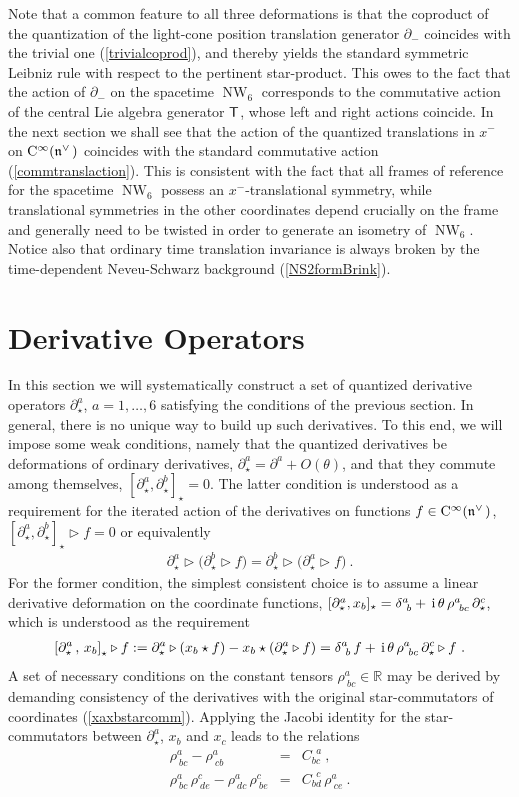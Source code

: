 \documentclass[11pt,a4paper]{article}
\DeclareMathOperator{\NW}{NW}
\newcommand{\1}{\mathbb{1}}
\def\ii{{\,{\rm i}\,}}
\def\CC{{\rm C}}
\def\T{{\sf T}}
\def\mfn{{\mathfrak n}}
\newcommand{\newsection}{\setcounter{equation}{0}\section}
\newcommand{\real}{{\mathbb R}} %
\def\bea{\begin{eqnarray}}
\newcommand{\beq}{\begin{eqnarray}}
\newcommand{\eeq}{\end{eqnarray}}
\begin{document}
Note that a common feature to all three deformations is that the coproduct
of the quantization of the light-cone position translation generator
$\partial_-$ coincides with the trivial one (\ref{trivialcoprod}), and
thereby yields the standard symmetric Leibniz rule with respect to the
pertinent star-product. This owes to the fact that the action of
$\partial_-$ on the spacetime $\NW_6$ corresponds to the commutative
action of the central Lie algebra generator $\T$, whose left and right actions
coincide. In the next section we shall see that the action of the
quantized translations in $x^-$ on $\CC^\infty(\mfn^{\vee\,})$ coincides with
the standard commutative action (\ref{commtranslaction}). This is
consistent with the fact that all frames of reference for the
spacetime $\NW_6$ possess an $x^-$-translational symmetry, while
translational symmetries in the other coordinates depend crucially on
the frame and generally need to be twisted in order to generate an
isometry of $\NW_6$. Notice also that ordinary time translation
invariance is always broken by the time-dependent Neveu-Schwarz
background (\ref{NS2formBrink}).

\newsection{Derivative Operators \label{Derivatives}}

In this section we will systematically construct a set of quantized
derivative operators $\partial^a_\star$, $a=1,\dots,6$ satisfying the
conditions of the previous section. In general, there is no unique way
to build up such derivatives. To this end, we will impose some weak
conditions, namely that the quantized derivatives be deformations of
ordinary derivatives, $\partial_\star^a=\partial^a+O(\theta)$, and
that they commute among themselves,
$[\partial_\star^a,\partial_\star^b]_\star=0$. The latter condition is
understood as a requirement for the iterated action of the derivatives
on functions $f\in\CC^\infty(\mfn^{\vee\,})$,
$[\partial_\star^a,\partial_\star^b]_\star\triangleright f=0$ or
equivalently
\beq
\partial_\star^a\triangleright\bigl(\partial_\star^b\triangleright f
\bigr)=\partial_\star^b\triangleright\bigl(\partial_\star^a\triangleright
f\bigr) \ .
\label{derivcommute}\eeq
For the former condition, the simplest consistent choice is to assume
a linear derivative deformation on the coordinate functions,
$[\partial_\star^a,x_b]_\star=
\delta^a_{~b}+\ii\theta\,\rho^a_{~bc}\,\partial^c_\star$, which is
understood as the requirement
\beq
\left[\partial_\star^a\,,\,x_b\right]_\star\triangleright f:=
\partial^a_\star\triangleright\left(x_b\star f\right)-
x_b\star\left(\partial_\star^a\triangleright f\right)=
\delta^a_{~b}\,f+\ii\theta\,\rho^a_{~bc}\,\partial^c_\star
\triangleright f \ .
\label{dxreq}\eeq
A set of necessary conditions on the constant tensors
$\rho^a_{~bc}\in\real$ may be derived by demanding consistency of the
derivatives with the original star-commutators of coordinates
(\ref{xaxbstarcomm}). Applying the Jacobi identity for the
star-commutators between $\partial^a_\star$, $x_b$ and $x_c$ leads to
the relations
\bea
\rho^a_{~bc}-\rho^a_{~cb}&=&C_{bc}^{~~a} \ , \nonumber\\
\rho^a_{~bc}\,\rho^c_{~de}-\rho^a_{~dc}\,\rho^c_{~be}&=&
C_{bd}^{~~c}\,\rho^a_{~ce} \ .
\label{rhoCrels}\eeq
\end{document}
